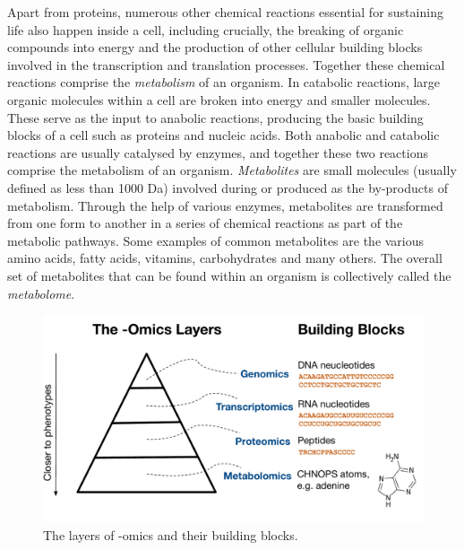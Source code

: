 Apart from proteins, numerous other chemical reactions essential for sustaining life also happen inside a cell, including crucially, the breaking of organic compounds into energy and the production of other cellular building blocks involved in the transcription and translation processes. Together these chemical reactions comprise the \emph{metabolism} of an organism. In catabolic reactions, large organic molecules within a cell are broken into energy and smaller molecules. These serve as the input to anabolic reactions, producing the basic building blocks of a cell such as proteins and nucleic acids. Both anabolic and catabolic reactions are usually catalysed by enzymes, and together these two reactions comprise the metabolism of an organism. \emph{Metabolites} are small molecules (usually defined as less than 1000 Da) involved during or produced as the by-products of metabolism. Through the help of various enzymes, metabolites are transformed from one form to another in a series of chemical reactions as part of the metabolic pathways. Some examples of common metabolites are the various amino acids, fatty acids, vitamins, carbohydrates and many others. The overall set of metabolites that can be found within an organism is collectively called the \emph{metabolome}. 


\begin{figure}
\noindent \begin{centering}
\includegraphics[width=1.0\textwidth]{02-background/figures/omics}
\par\end{centering}
\caption{\label{fig:omics-triangle}The layers of -omics and their building blocks.}
\end{figure}

